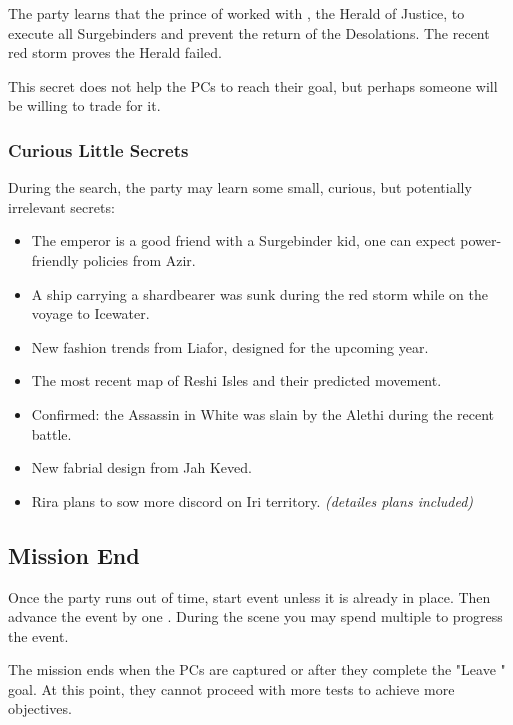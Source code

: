 The party learns that the prince of \locationTashikk{} worked with \npcNale{}, the Herald of Justice, to execute all Surgebinders and prevent the return of the Desolations. The recent red storm proves the Herald failed.

This secret does not help the PCs to reach their goal, but perhaps someone will be willing to trade for it.

\newpage
\subsubsection{Curious Little Secrets}

During the search, the party may learn some small, curious, but potentially irrelevant secrets:

\begin{itemize}
	\item The emperor is a good friend with a Surgebinder kid, one can expect power-friendly policies from Azir.
	\item A ship carrying a shardbearer was sunk during the red storm while on the voyage to Icewater.
	\item New fashion trends from Liafor, designed for the upcoming year.
	\item The most recent map of Reshi Isles and their predicted movement.
	\item Confirmed: the Assassin in White was slain by the Alethi during the recent battle.
	\item New fabrial design from Jah Keved.
	\item Rira plans to sow more discord on Iri territory. \textit{(detailes plans included)}
\end{itemize}





\subsection{Mission End}

Once the party runs out of time, start  event unless it is already in place. Then advance the event by one \iconComp{}. During the scene you may spend multiple \iconComp{} to progress the event.

The mission ends when the PCs are captured or after they complete the "Leave \locationIndicium{}" goal. At this point, they cannot proceed with more tests to achieve more objectives.